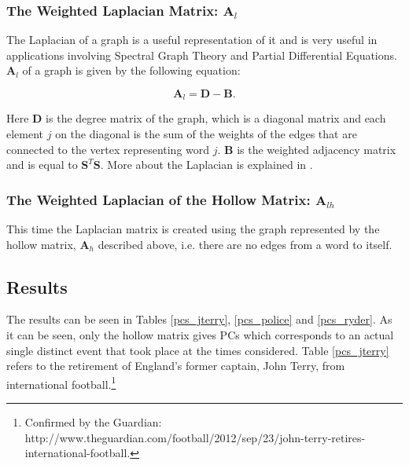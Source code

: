 \documentclass[graybox]{svmult}
\newcommand{\smat}{\mathbf{S}}
\newcommand{\covmat}{\mathbf{A}}
\newcommand{\tp}{^T}
\begin{document}
\subsubsection{The Weighted Laplacian Matrix: $\mathbf{A}_{l}$}

The Laplacian of a graph is a useful representation of it and is very useful in applications involving Spectral Graph Theory and Partial Differential Equations. $\mathbf{A}_{l}$ of a graph is given by the following equation:

\begin{equation}
\mathbf{A}_{l} = \mathbf{D} - \mathbf{B}.
\end{equation}

Here $\mathbf{D}$ is the degree matrix of the graph, which is a diagonal matrix and each element $j$ on the diagonal is the sum of the weights of the edges that are connected to the vertex representing word $j$. $\mathbf{B}$ is the weighted adjacency matrix and is equal to $\smat\tp\smat$. More about the Laplacian is explained in \cite{laplacian_spielman}. 

\subsubsection{The Weighted Laplacian of the Hollow Matrix: $\mathbf{A}_{lh}$}

This time the Laplacian matrix is created using the graph represented by the hollow matrix, $\covmat_h$ described above, i.e. there are no edges from a word to itself.

\subsection{Results}

The results can be seen in Tables \ref{pcs_jterry}, \ref{pcs_police} and \ref{pcs_ryder}. As it can be seen, only the hollow matrix gives PCs which corresponds to an actual single distinct event that took place at the times considered. Table \ref{pcs_jterry} refers to the retirement of England's former captain, John Terry, from international football.\footnote{Confirmed by the Guardian: http://www.theguardian.com/football/2012/sep/23/john-terry-retires-international-football.} 
\end{document}
